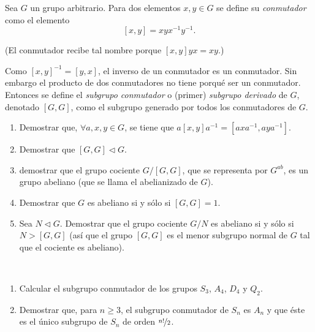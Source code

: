 \begin{ejercicio}
    Sea $G$ un grupo arbitrario. Para dos elementos $x,y\in G$ se define su \emph{conmutador} como el elemento
    \[
        [x,y] = xyx^{-1}y^{-1}.
    \]
    \begin{observacion}
        (El conmutador recibe tal nombre porque $[x,y]yx=xy$.)
    \end{observacion}
    
    Como $[x,y]^{-1}=[y,x]$, el inverso de un conmutador es un conmutador. Sin embargo el producto de dos conmutadores no tiene porqué ser un conmutador. Entonces se define el \emph{subgrupo conmutador} o (primer) \emph{subgrupo derivado} de $G$, denotado $[G,G]$, como el subgrupo generado por todos los conmutadores de $G$.
    \begin{enumerate}
        \item Demostrar que, $\forall a,x,y\in G$, se tiene que $a[x,y]a^{-1}=[axa^{-1},aya^{-1}]$.
        \item Demostrar que $[G,G]\lhd G$.
        \item demostrar que el grupo cociente $G/[G,G]$, que se representa por $G^{ab}$, es un grupo abeliano (que se llama el abelianizado de $G$).
        \item Demostrar que $G$ es abeliano si y sólo si $[G,G]=1$.
        \item Sea $N\lhd G$. Demostrar que el grupo cociente $G/N$ es abeliano si y sólo si $N>[G,G]$ (así que el grupo $[G,G]$ es el menor subgrupo normal de $G$ tal que el cociente es abeliano).
    \end{enumerate}
\end{ejercicio}

\begin{ejercicio}~
    \begin{enumerate}
        \item Calcular el subgrupo conmutador de los grupos $S_3$, $A_4$, $D_4$ y $Q_2$.
        \item Demostrar que, para $n\geq 3$, el subgrupo conmutador de $S_n$ es $A_n$ y que éste es el único subgrupo de $S_n$ de orden $\nicefrac{n!}{2}$.
    \end{enumerate}
\end{ejercicio}



